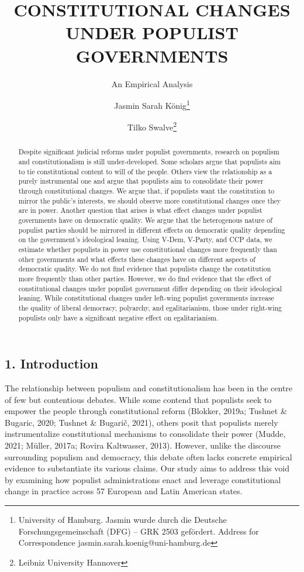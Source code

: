 \documentclass[
  abstract]{article}
\title{CONSTITUTIONAL CHANGES UNDER POPULIST GOVERNMENTS}
\subtitle{An Empirical Analysis}
\author{Jasmin Sarah König\footnote{University of Hamburg. Jasmin wurde
  durch die Deutsche Forschungsgemeinschaft (DFG) -- GRK 2503 gefördert.
  Address for Correspondence jasmin.sarah.koenig@uni-hamburg.de} \and Tilko
Swalve\footnote{Leibniz University Hannover}}
\date{}
\begin{document}
\maketitle
\begin{abstract}
Despite significant judicial reforms under populist governments,
research on populism and constitutionalism is still under-developed.
Some scholars argue that populists aim to tie constitutional content to
will of the people. Others view the relationship as a purely
instrumental one and argue that populists aim to consolidate their power
through constitutional changes. We argue that, if populists want the
constitution to mirror the public's interests, we should observe more
constitutional changes once they are in power. Another question that
arises is what effect changes under populist governments have on
democratic quality. We argue that the heterogenous nature of populist
parties should be mirrored in different effects on democratic quality
depending on the government's ideological leaning. Using V-Dem, V-Party,
and CCP data, we estimate whether populists in power use constitutional
changes more frequently than other governments and what effects these
changes have on different aspects of democratic quality. We do not find
evidence that populists change the constitution more frequently than
other parties. However, we do find evidence that the effect of
constitutional changes under populist government differ depending on
their ideological leaning. While constitutional changes under left-wing
populist governments increase the quality of liberal democracy,
polyarchy, and egalitarianism, those under right-wing populists only
have a significant negative effect on egalitarianism.
\end{abstract}
\ifdefined\Shaded\renewenvironment{Shaded}{\begin{tcolorbox}[enhanced, sharp corners, frame hidden, interior hidden, boxrule=0pt, breakable, borderline west={3pt}{0pt}{shadecolor}]}{\end{tcolorbox}}\fi

\newpage{}

\hypertarget{introduction}{%
\subsection{1. Introduction}\label{introduction}}

The relationship between populism and constitutionalism has been in the
centre of few but contentious debates. While some contend that populists
seek to empower the people through constitutional reform (Blokker,
2019a; Tushnet \& Bugaric, 2020; Tushnet \& Bugarič, 2021), others posit
that populists merely instrumentalize constitutional mechanisms to
consolidate their power (Mudde, 2021; Müller, 2017a; Rovira Kaltwasser,
2013). However, unlike the discourse surrounding populism and democracy,
this debate often lacks concrete empirical evidence to substantiate its
various claims. Our study aims to address this void by examining how
populist administrations enact and leverage constitutional change in
practice across 57 European and Latin American states.
\end{document}
